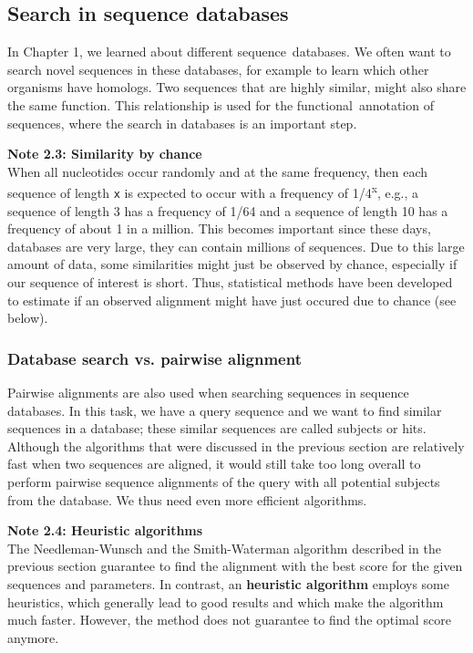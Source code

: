 \subsection{Search in sequence databases}\label{chapter2_sequence_search}

In Chapter 1, we learned about different sequence~databases.
We often want to search novel sequences in these databases, for example to learn which other organisms have homologs.
Two sequences that are highly similar, might also share the same function.
This relationship is used for the functional~annotation of sequences, where the search in databases is an important step.

\begin{framed}
\textbf{Note 2.3: Similarity by chance}\\
When all nucleotides occur randomly and at the same frequency, then each sequence of length \texttt{x} is expected to occur with a frequency of 1/4\textsuperscript{x}, e.g., a sequence of length 3 has a frequency of 1/64 and a sequence of length 10 has a frequency of about 1 in a million.
This becomes important since these days, databases are very large, they can contain millions of sequences.
Due to this large amount of data, some similarities might just be observed by chance, especially if our sequence of interest is short.
Thus, statistical methods have been developed to estimate if an observed alignment might have just occured due to chance (see below).
\end{framed}

\subsubsection{Database search vs. pairwise alignment}

Pairwise alignments are also used when searching sequences in sequence databases.
In this task, we have a query sequence and we want to find similar sequences in a database; these similar sequences are called subjects or hits.
Although the algorithms that were discussed in the previous section are relatively fast when two sequences are aligned, it would still take too long overall to perform pairwise sequence alignments of the query with all potential subjects from the database.
We thus need even more efficient algorithms.

\begin{framed}
\textbf{Note 2.4: Heuristic algorithms}\\
The Needleman-Wunsch and the Smith-Waterman algorithm described in the previous section guarantee to find the alignment with the best score for the given sequences and parameters.
In contrast, an \textbf{heuristic algorithm} employs some heuristics, which generally lead to good results and which make the algorithm much faster. However, the method does not guarantee to find the optimal score anymore.
\end{framed}

